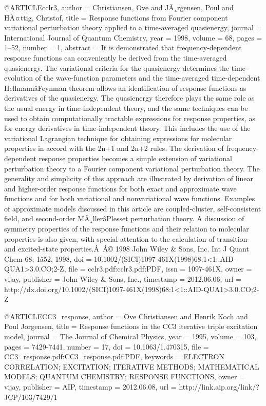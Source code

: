 @ARTICLE{cclr3,
  author = {Christiansen, Ove and JÃ¸rgensen, Poul and HÃ¤ttig, Christof},
  title = {Response functions from Fourier component variational perturbation
	theory applied to a time-averaged quasienergy},
  journal = {International Journal of Quantum Chemistry},
  year = {1998},
  volume = {68},
  pages = {1--52},
  number = {1},
  abstract = {It is demonstrated that frequency-dependent response functions can
	conveniently be derived from the time-averaged quasienergy. The variational
	criteria for the quasienergy determines the time-evolution of the
	wave-function parameters and the time-averaged time-dependent HellmannâFeynman
	theorem allows an identification of response functions as derivatives
	of the quasienergy. The quasienergy therefore plays the same role
	as the usual energy in time-independent theory, and the same techniques
	can be used to obtain computationally tractable expressions for response
	properties, as for energy derivatives in time-independent theory.
	This includes the use of the variational Lagrangian technique for
	obtaining expressions for molecular properties in accord with the
	2n+1 and 2n+2 rules. The derivation of frequency-dependent response
	properties becomes a simple extension of variational perturbation
	theory to a Fourier component variational perturbation theory. The
	generality and simplicity of this approach are illustrated by derivation
	of linear and higher-order response functions for both exact and
	approximate wave functions and for both variational and nonvariational
	wave functions. Examples of approximate models discussed in this
	article are coupled-cluster, self-consistent field, and second-order
	MÃ¸llerâPlesset perturbation theory. A discussion of symmetry properties
	of the response functions and their relation to molecular properties
	is also given, with special attention to the calculation of transition-
	and excited-state properties.Â Â© 1998 John Wiley & Sons, Inc. Int
	J Quant Chem 68: 1â52, 1998},
  doi = {10.1002/(SICI)1097-461X(1998)68:1<1::AID-QUA1>3.0.CO;2-Z},
  file = {cclr3.pdf:cclr3.pdf:PDF},
  issn = {1097-461X},
  owner = {vijay},
  publisher = {John Wiley \& Sons, Inc.},
  timestamp = {2012.06.06},
  url = {http://dx.doi.org/10.1002/(SICI)1097-461X(1998)68:1<1::AID-QUA1>3.0.CO;2-Z}
}

@ARTICLE{CC3_response,
  author = {Ove Christiansen and Henrik Koch and Poul Jorgensen},
  title = {Response functions in the CC3 iterative triple excitation model},
  journal = {The Journal of Chemical Physics},
  year = {1995},
  volume = {103},
  pages = {7429-7441},
  number = {17},
  doi = {10.1063/1.470315},
  file = {CC3_response.pdf:CC3_response.pdf:PDF},
  keywords = {ELECTRON CORRELATION; EXCITATION; ITERATIVE METHODS; MATHEMATICAL
	MODELS; QUANTUM CHEMISTRY; RESPONSE FUNCTIONS},
  owner = {vijay},
  publisher = {AIP},
  timestamp = {2012.06.08},
  url = {http://link.aip.org/link/?JCP/103/7429/1}
}

